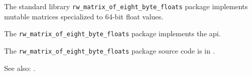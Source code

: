 
The standard library {\tt rw\_matrix\_of\_eight\_byte\_floats} package implements mutable matrices specialized to 64-bit float values.

The {\tt rw\_matrix\_of\_eight\_byte\_floats} package implements the  api.

The {\tt rw\_matrix\_of\_eight\_byte\_floats} package source code is in .

See also:  .


